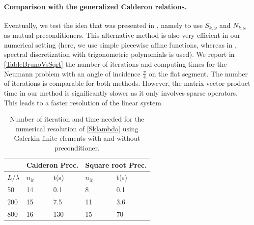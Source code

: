 \documentclass[a4paper]{subfiles}
\begin{document}
\paragraph{Comparison with the generalized Calderon relations.} Eventually, we test the idea that was presented in \cite{bruno2012second}, namely 
to use $S_{k,\omega}$ and $N_{k,\omega}$ as mutual preconditioners. This alternative method is also very efficient in our numerical setting (here, we use 
simple piecewise affine functions, whereas in \cite{bruno2012second}, spectral discretization with trigonometric polynomials is used). We report in 
\autoref{TableBrunoVsSqrt} the number of iterations and computing times for the Neumann problem with an angle of incidence $\frac{\pi}{4}$ on the 
flat segment. The number of iterations is comparable for both methods. However, the matrix-vector product time in our method is significantly 
slower as it only involves sparse operators. This leads to a faster resolution of the linear system. 

\begin{table}[H]
	\begin{center}
		\begin{tabular}{m{4em} | m{4em} | m{4em} | m{4em} | m{4em}} 
			\hline
			\multicolumn{1}{c|}{ }&
			\multicolumn{2}{c|}{Calderon Prec.}&\multicolumn{2}{c}{Square root Prec.}\\
			\hline
			$L/\lambda$ & $n_{it}$& t(s) & $n_{it}$ & t(s)\\
			\hline\hline
			50 & 14 & 0.1 & 8 & 0.1\\
			\hline
			200 & 15 & 7.5 & 11 &  3.6\\
			\hline
			800 & 16 & 130 & 15 & 70\\
			\hline
		\end{tabular}
	\end{center}
	\caption{Number of iteration and time needed for the numerical resolution of \eqref{Sklambda} using Galerkin finite elements with and without preconditioner.}
	\label{TableBrunoVsSqrt}
\end{table}
	
\end{document}
